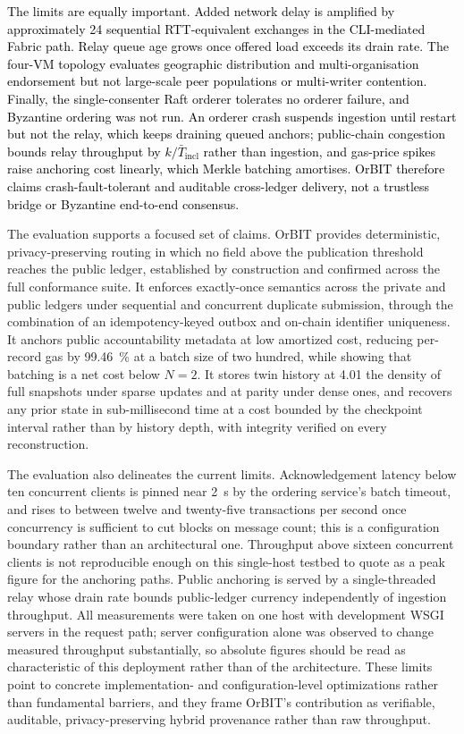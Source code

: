 \documentclass[final,5p,times,twocolumn]{elsarticle}
\begin{document}
\textcolor{black}{The limits are equally important. Added network delay is amplified by approximately 24 sequential RTT-equivalent exchanges in the CLI-mediated Fabric path. Relay queue age grows once offered load exceeds its drain rate. The four-VM topology evaluates geographic distribution and multi-organisation endorsement but not large-scale peer populations or multi-writer contention. Finally, the single-consenter Raft orderer tolerates no orderer failure, and Byzantine ordering was not run.} \textcolor{black}{An orderer crash suspends ingestion until restart but not the relay, which keeps draining queued anchors; public-chain congestion bounds relay throughput by $k/\bar{T}_{\mathrm{incl}}$ rather than ingestion, and gas-price spikes raise anchoring cost linearly, which Merkle batching amortises.} \textcolor{black}{OrBIT therefore claims crash-fault-tolerant and auditable cross-ledger delivery, not a trustless bridge or Byzantine end-to-end consensus.}

\iffalse

The evaluation supports a focused set of claims. OrBIT provides deterministic,
privacy-preserving routing in which no field above the publication threshold
reaches the public ledger, established by construction and confirmed across the
full conformance suite. It enforces exactly-once semantics across the private
and public ledgers under sequential and concurrent duplicate submission, through
the combination of an idempotency-keyed outbox and on-chain identifier
uniqueness. It anchors public accountability metadata at low amortized cost,
reducing per-record gas by \SI{99.46}{\percent} at a batch size of two hundred,
while showing that batching is a net cost below $N=2$. It stores twin history at
\SI{4.01}{\times} the density of full snapshots under sparse updates and at
parity under dense ones, and recovers any prior state in sub-millisecond time at
a cost bounded by the checkpoint interval rather than by history depth, with
integrity verified on every reconstruction.

The evaluation also delineates the current limits. Acknowledgement latency below
ten concurrent clients is pinned near \SI{2}{\second} by the ordering service's
batch timeout, and rises to between twelve and twenty-five transactions per
second once concurrency is sufficient to cut blocks on message count; this is a
configuration boundary rather than an architectural one. Throughput above
sixteen concurrent clients is not reproducible enough on this single-host
testbed to quote as a peak figure for the anchoring paths. Public anchoring is
served by a single-threaded relay whose drain rate bounds public-ledger currency
independently of ingestion throughput. All measurements were taken on one host
with development WSGI servers in the request path; server configuration alone
was observed to change measured throughput substantially, so absolute figures
should be read as characteristic of this deployment rather than of the
architecture. These limits point to concrete implementation- and
configuration-level optimizations rather than fundamental barriers, and they
frame OrBIT's contribution as verifiable, auditable, privacy-preserving hybrid
provenance rather than raw throughput.
\end{document}
